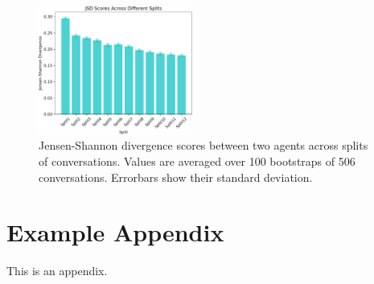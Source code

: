 \documentclass[11pt]{article}
\begin{document}
\begin{figure}
  \centering
  \includegraphics[width=0.45\textwidth]{figures/jsd_scores_splits}
  \caption{Jensen-Shannon divergence scores between two agents across splits of conversations. Values are averaged over 100 bootstraps of 506 conversations. Errorbars show their standard deviation.}
  \label{fig:jsd}
\end{figure}
%


\appendix

\section{Example Appendix}
\label{sec:appendix}

This is an appendix.
\end{document}
